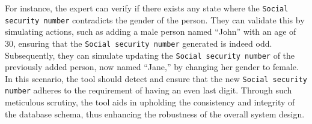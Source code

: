 For instance, the expert can verify if there exists any state where the \texttt{Social security number} contradicts the gender of the person.
They can validate this by simulating actions, such as adding a male person named ``John'' with an age of 30, ensuring that the \texttt{Social security number} generated is indeed odd.
Subsequently, they can simulate updating the \texttt{Social security number} of the previously added person, now named ``Jane,'' by changing her gender to female.
In this scenario, the tool should detect and ensure that the new \texttt{Social security number} adheres to the requirement of having an even last digit.
Through such meticulous scrutiny, the tool aids in upholding the consistency and integrity of the database schema, thus enhancing the robustness of the overall system design.


%
%
%
